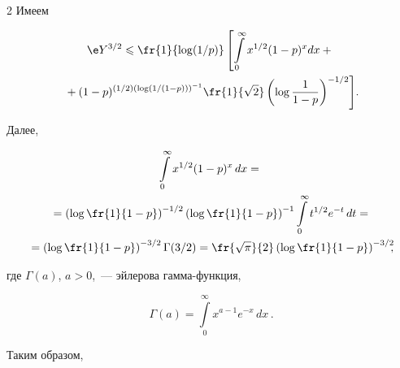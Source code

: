 \begin{multicols}{2}
Имеем





\noindent


\begin{multline*}


\e Y^{3/2} \leqslant


\fr{1}{\log({1}/{p})}\left[\int\limits_{0}^\infty


x^{{1}/{2}}(1-p)^x dx +{}\right.\\


\left.{}+


(1-p)^{(1/2)\left(\log(1/({1-p}))\right)^{-1}}


\fr{1}{\sqrt{2}}\left(\log\frac1{1-p}\right)^{-1/2}\right]\!.




\end{multline*}


Далее,





\noindent


\begin{multline*}


 \int\limits_{0}^\infty x^{1/2}(1-p)^x\, dx


={}\\


{}=


 \left(\log\fr{1}{1-p}\right)^{-1/2}


\left(\log\fr{1}{1-p}\right)^{-1} \int\limits_{0}^\infty


t^{{1}/{2}}e^{-t}\, dt ={}\\


{}=


\left(\log\fr{1}{1-p}\right)^{-3/2}\Gamma(3/2) =


\fr{\sqrt{\pi}}{2}\left(\log\fr{1}{1-p}\right)^{-3/2}\!\!\!,


\end{multline*}


где $\Gamma(a)$, $a>0$,~--- эйлерова гамма-функция,


$$


\Gamma(a)=\int\limits_{0}^{\infty}x^{a-1}e^{-x}\,dx\,.


$$


Таким образом,





\noindent


\begin{multline*}



\end{multline*}
\end{multicols}

